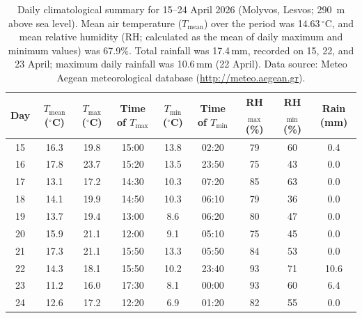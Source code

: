 \documentclass[11pt,a4paper]{article}
\begin{document}
\clearpage


\setcounter{figure}{0}
\renewcommand{\thefigure}{S\arabic{figure}}

\renewcommand{\thetable}{S\arabic{table}}
\setcounter{table}{0}


\begin{table}[!htbp]
\centering
\begingroup
\fontsize{9}{11}\selectfont

\caption{Daily climatological summary for 15--24 April 2026 (Molyvos, Lesvos; 290~m above sea level). Mean air temperature ($T_{\mathrm{mean}}$) over the period was 14.63\,$^\circ$C, and mean relative humidity (RH; calculated as the mean of daily maximum and minimum values) was 67.9\%. Total rainfall was 17.4\,mm, recorded on 15, 22, and 23 April; maximum daily rainfall was 10.6\,mm (22 April). Data source: Meteo Aegean meteorological database (\url{http://meteo.aegean.gr}).}
\label{tab:supp_climate_apr15_24}

\setlength{\tabcolsep}{4pt}

\begin{tabular}{ccccccccc}
\toprule
Day & $T_{\mathrm{mean}}$ ($^\circ$C) & $T_{\max}$ ($^\circ$C) & Time of $T_{\max}$ & $T_{\min}$ ($^\circ$C) & Time of $T_{\min}$ & RH$_{\max}$ (\%) & RH$_{\min}$ (\%) & Rain (mm) \\
\midrule
15 & 16.3 & 19.8 & 15:00 & 13.8 & 02:20 & 79 & 60 & 0.4 \\
16 & 17.8 & 23.7 & 15:20 & 13.5 & 23:50 & 75 & 43 & 0.0 \\
17 & 13.1 & 17.2 & 14:30 & 10.3 & 07:20 & 85 & 63 & 0.0 \\
18 & 14.1 & 19.9 & 14:50 & 10.3 & 06:10 & 79 & 36 & 0.0 \\
19 & 13.7 & 19.4 & 13:00 & 8.6  & 06:20 & 80 & 47 & 0.0 \\
20 & 15.9 & 21.1 & 12:00 & 9.1  & 05:10 & 75 & 45 & 0.0 \\
21 & 17.3 & 21.1 & 15:50 & 13.3 & 05:50 & 84 & 53 & 0.0 \\
22 & 14.3 & 18.1 & 15:50 & 10.2 & 23:40 & 93 & 71 & 10.6 \\
23 & 11.2 & 16.0 & 17:30 & 8.1  & 00:00 & 93 & 60 & 6.4 \\
24 & 12.6 & 17.2 & 12:20 & 6.9  & 01:20 & 82 & 55 & 0.0 \\
\bottomrule
\end{tabular}

\endgroup
\end{table}
\end{document}
